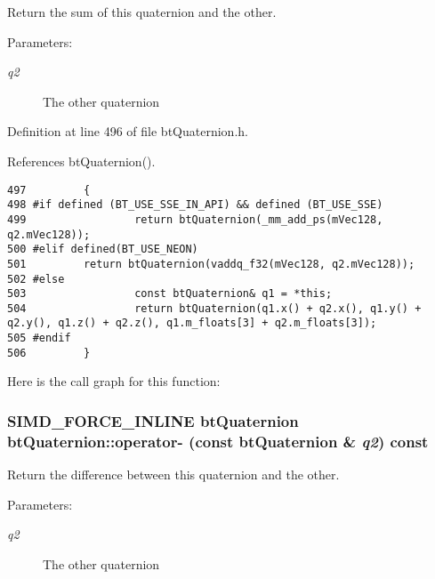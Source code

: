 Return the sum of this quaternion and the other. 

\begin{Desc}
\item[Parameters:]
\begin{description}
\item[{\em q2}]The other quaternion \end{description}
\end{Desc}


Definition at line 496 of file btQuaternion.h.

References btQuaternion().

\begin{Code}\begin{verbatim}497         {
498 #if defined (BT_USE_SSE_IN_API) && defined (BT_USE_SSE)
499                 return btQuaternion(_mm_add_ps(mVec128, q2.mVec128));
500 #elif defined(BT_USE_NEON)
501         return btQuaternion(vaddq_f32(mVec128, q2.mVec128));
502 #else   
503                 const btQuaternion& q1 = *this;
504                 return btQuaternion(q1.x() + q2.x(), q1.y() + q2.y(), q1.z() + q2.z(), q1.m_floats[3] + q2.m_floats[3]);
505 #endif
506         }
\end{verbatim}
\end{Code}




Here is the call graph for this function:\hypertarget{classbt_quaternion_10ee93d7c0a20d0630fa8e8de85bad0c}{
\subsubsection[operator-]{\setlength{\rightskip}{0pt plus 5cm}SIMD\_\-FORCE\_\-INLINE {\bf btQuaternion} btQuaternion::operator- (const {\bf btQuaternion} \& {\em q2}) const}}
\label{classbt_quaternion_10ee93d7c0a20d0630fa8e8de85bad0c}


Return the difference between this quaternion and the other. 

\begin{Desc}
\item[Parameters:]
\begin{description}
\item[{\em q2}]The other quaternion \end{description}
\end{Desc}


